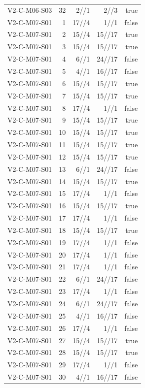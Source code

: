 {\begin{longtable}{lrrrr}
V2-C-M06-S03 & 32 & 2//1 & 2//3 & true \\
V2-C-M07-S01 & 1 & 17//4 & 1//1 & false \\
V2-C-M07-S01 & 2 & 15//4 & 15//17 & true \\
V2-C-M07-S01 & 3 & 15//4 & 15//17 & true \\
V2-C-M07-S01 & 4 & 6//1 & 24//17 & false \\
V2-C-M07-S01 & 5 & 4//1 & 16//17 & false \\
V2-C-M07-S01 & 6 & 15//4 & 15//17 & true \\
V2-C-M07-S01 & 7 & 15//4 & 15//17 & true \\
V2-C-M07-S01 & 8 & 17//4 & 1//1 & false \\
V2-C-M07-S01 & 9 & 15//4 & 15//17 & true \\
V2-C-M07-S01 & 10 & 15//4 & 15//17 & true \\
V2-C-M07-S01 & 11 & 15//4 & 15//17 & true \\
V2-C-M07-S01 & 12 & 15//4 & 15//17 & true \\
V2-C-M07-S01 & 13 & 6//1 & 24//17 & false \\
V2-C-M07-S01 & 14 & 15//4 & 15//17 & true \\
V2-C-M07-S01 & 15 & 17//4 & 1//1 & false \\
V2-C-M07-S01 & 16 & 15//4 & 15//17 & true \\
V2-C-M07-S01 & 17 & 17//4 & 1//1 & false \\
V2-C-M07-S01 & 18 & 15//4 & 15//17 & true \\
V2-C-M07-S01 & 19 & 17//4 & 1//1 & false \\
V2-C-M07-S01 & 20 & 17//4 & 1//1 & false \\
V2-C-M07-S01 & 21 & 17//4 & 1//1 & false \\
V2-C-M07-S01 & 22 & 6//1 & 24//17 & false \\
V2-C-M07-S01 & 23 & 17//4 & 1//1 & false \\
V2-C-M07-S01 & 24 & 6//1 & 24//17 & false \\
V2-C-M07-S01 & 25 & 4//1 & 16//17 & false \\
V2-C-M07-S01 & 26 & 17//4 & 1//1 & false \\
V2-C-M07-S01 & 27 & 15//4 & 15//17 & true \\
V2-C-M07-S01 & 28 & 15//4 & 15//17 & true \\
V2-C-M07-S01 & 29 & 17//4 & 1//1 & false \\
V2-C-M07-S01 & 30 & 4//1 & 16//17 & false \\

\end{longtable}}

